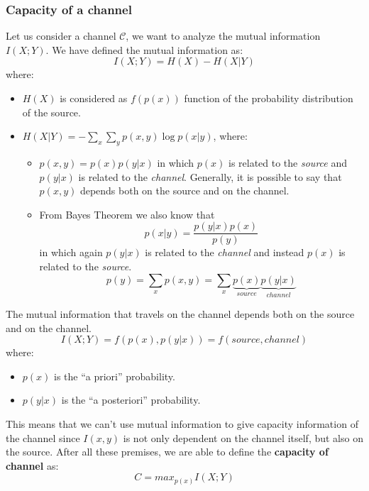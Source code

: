 \subsubsection{Capacity of a channel}
Let us consider a channel $\mathcal{C}$, we want to analyze the mutual information $I(X;Y)$. We have defined the mutual information as:
$$I(X;Y) = H(X) - H(X|Y)$$
where:
\begin{itemize}
	\item $H(X)$ is considered as $f(p(x))$ function of the probability distribution of the source.
	\item $H(X|Y) = -\sum_x \sum_y p(x,y) \log{p(x|y)}$, where:
		\begin{itemize}
			\item $p(x,y) = p(x)p(y|x)$ in which $p(x)$ is related to the \textit{source} and $p(y|x)$ is related to the \textit{channel}. Generally, it is possible to say that $p(x,y)$ depends both on the source and on the channel.
			\item From Bayes Theorem we also know that $$p(x|y) = \frac{p(y|x) p(x)}{p(y)}$$ in which again $p(y|x)$ is related to the \textit{channel} and instead $p(x)$ is related to the \textit{source}.
			$$p(y) = \sum_x p(x,y) = \sum_x \underbrace{p(x)}_{source}\underbrace{p(y|x)}_{channel}$$
		\end{itemize} 
\end{itemize}
The mutual information that travels on the channel depends both on the source and on the channel.
$$I(X;Y) = f(p(x), p(y|x)) = f(source, channel)$$
where:
\begin{itemize}
	\item $p(x)$ is the ``a priori''  probability.
	\item $p(y|x)$ is the ``a posteriori'' probability.
\end{itemize}
This means that we can't use mutual information to give capacity information of the channel since $I(x,y)$ is not only dependent on the channel itself, but also on the source.	
After all these premises, we are able to define the \textbf{capacity of channel} as:
$$C = max_{p(x)} I(X;Y)$$

